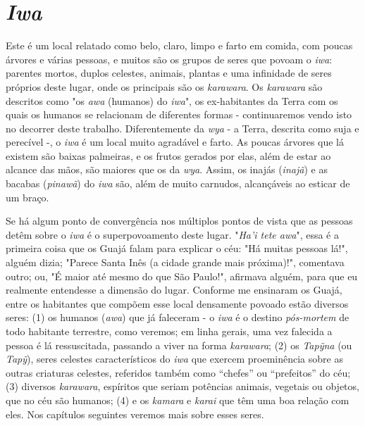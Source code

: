 \section{\emph{Iwa}}\label{iwa}

Este é um local relatado como belo, claro, limpo e farto em comida, com
poucas árvores e várias pessoas, e muitos são os grupos de seres que
povoam o \emph{iwa}: parentes mortos, duplos celestes, animais, plantas
e uma infinidade de seres próprios deste lugar, onde os principais são
os \emph{karawara}. Os \emph{karawara} são descritos como "os \emph{awa}
(humanos) do \emph{iwa}", os ex-habitantes da Terra com os quais os
humanos se relacionam de diferentes formas - continuaremos vendo isto no
decorrer deste trabalho. Diferentemente da \emph{wya} - a Terra,
descrita como suja e perecível -, o \emph{iwa} é um local muito
agradável e farto. As poucas árvores que lá existem são baixas
palmeiras, e os frutos gerados por elas, além de estar ao alcance das
mãos, são maiores que os da \emph{wya}. Assim, os inajás (\emph{inajã})
e as bacabas (\emph{pinawã}) do \emph{iwa} são, além de muito carnudos,
alcançáveis ao esticar de um braço.

Se há algum ponto de convergência nos múltiplos pontos de vista que as
pessoas detêm sobre o \emph{iwa} é o superpovoamento deste lugar.
"\emph{Ha'i tete awa}", essa é a primeira coisa que os Guajá falam para
explicar o céu: "Há muitas pessoas lá!", alguém dizia; "Parece Santa
Inês (a cidade grande mais próxima)!", comentava outro; ou, "É maior até
mesmo do que São Paulo!", afirmava alguém, para que eu realmente
entendesse a dimensão do lugar. Conforme me ensinaram os Guajá, entre os
habitantes que compõem esse local densamente povoado estão diversos
seres: (1) os humanos (\emph{awa}) que já faleceram - o \emph{iwa} é o
destino \emph{pós-mortem} de todo habitante terrestre, como veremos; em
linha gerais, uma vez falecida a pessoa é lá ressuscitada, passando a
viver na forma \emph{karawara}; (2) os \emph{Tapỹna} (ou \emph{Tapỹ}),
seres celestes característicos do \emph{iwa} que exercem proeminência
sobre as outras criaturas celestes, referidos também como ``chefes'' ou
``prefeitos'' do céu; (3) diversos \emph{karawara}, espíritos que seriam
potências animais, vegetais ou objetos, que no céu são humanos; (4) e os
\emph{kamara} e \emph{karai} que têm uma boa relação com eles. Nos
capítulos seguintes veremos mais sobre esses seres.

